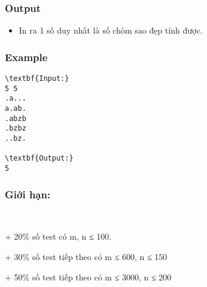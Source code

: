 \subsubsection{Output}
\begin{itemize}
	\item In ra 1 số duy nhất là số chòm sao đẹp tính được.
\end{itemize}

\subsubsection{Example}
\begin{verbatim}
\textbf{Input:}
5 5
.a...
a.ab.
.abzb
.bzbz
..bz.

\textbf{Output:}
5
\end{verbatim}

\subsubsection{Giới hạn:}

 

+ 20\% số test có m, n ≤ 100.

+ 30\% số test tiếp theo có m ≤ 600, n ≤ 150

+ 50\% số test tiếp theo có m ≤ 3000, n ≤ 200 \textbf{}